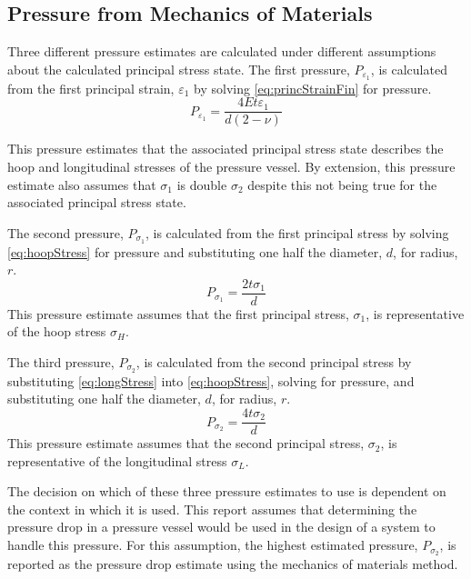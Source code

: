 \documentclass[10pt,journal,letterpaper]{IEEEtran}
\begin{document}
\subsection{Pressure from Mechanics of Materials}

Three different pressure estimates are calculated under different assumptions about the calculated principal stress state.
The first pressure, $P_{\varepsilon_1}$, is calculated from the first principal strain, $\varepsilon_1$ by solving \eqref{eq:princStrainFin} for pressure.
\begin{equation}
\label{eq:Peps1}
P_{\varepsilon_1} = \frac{4Et\varepsilon_1}{d(2-\nu)}
\end{equation}

This pressure estimates that the associated principal stress state describes the hoop and longitudinal stresses of the pressure vessel.
By extension, this pressure estimate also assumes that $\sigma_1$ is double $\sigma_2$ despite this not being true for the associated principal stress state.

The second pressure, $P_{\sigma_1}$, is calculated from the first principal stress by solving \eqref{eq:hoopStress} for pressure and substituting one half the diameter, $d$, for radius, $r$.
\begin{equation}
\label{eq:Psig1}
P_{\sigma_1} = \frac{2t\sigma_1}{d}
\end{equation}
This pressure estimate assumes that the first principal stress, $\sigma_1$, is representative of the hoop stress $\sigma_H$.

The third pressure, $P_{\sigma_2}$, is calculated from the second principal stress by substituting \eqref{eq:longStress} into \eqref{eq:hoopStress}, solving for pressure, and substituting one half the diameter, $d$, for radius, $r$.
\begin{equation}
\label{eq:Psig2}
P_{\sigma_2} = \frac{4t\sigma_2}{d}
\end{equation}
This pressure estimate assumes that the second principal stress, $\sigma_2$, is representative of the longitudinal stress $\sigma_L$.

The decision on which of these three pressure estimates to use is dependent on the context in which it is used.
This report assumes that determining the pressure drop in a pressure vessel would be used in the design of a system to handle this pressure.
For this assumption, the highest estimated pressure, $P_{\sigma_2}$, is reported as the pressure drop estimate using the mechanics of materials method.
\end{document}
